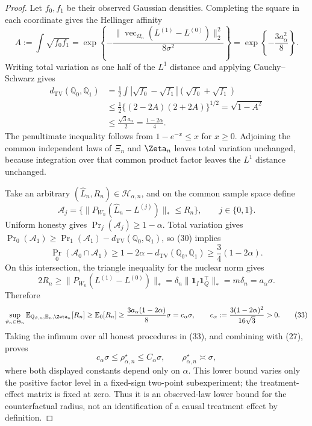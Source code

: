 \documentclass{article}
\begin{document}
\begin{proof}
Let \(f_0,f_1\) be their observed Gaussian densities.  Completing the square in each coordinate gives the Hellinger affinity
\[
A:=\int\sqrt{f_0f_1}
=\exp\!\left\{-\frac{\lVert
\operatorname{vec}_{\Omega_n}(L^{(1)}-L^{(0)})\rVert_2^2}
{8\sigma^2}\right\}
=\exp\!\left\{-\frac{3a_\alpha^2}{8}\right\}.       \tag{29}
\]
Writing total variation as one half of the \(L^1\) distance and applying Cauchy--Schwarz gives
\[
\begin{aligned}
d_{\mathrm{TV}}(\mathbb Q_0,\mathbb Q_1)
&=\frac12\int|\sqrt{f_0}-\sqrt{f_1}|(\sqrt{f_0}+\sqrt{f_1})\\
&\le\frac12\{(2-2A)(2+2A)\}^{1/2}
=\sqrt{1-A^2}\\
&\le\frac{\sqrt3a_\alpha}{2}
=\frac{1-2\alpha}{4}.                                  \tag{30}
\end{aligned}
\]
The penultimate inequality follows from \(1-e^{-x}\le x\) for \(x\ge0\).  Adjoining the common independent laws of \(\Xi_n\) and \(\Zeta_n\) leaves total variation unchanged, because integration over that common product factor leaves the \(L^1\) distance unchanged.

Take an arbitrary \((\widehat L_n,R_n)\in\mathcal H_{\alpha,n}\), and on the common sample space define
\[
\mathcal A_j=
\{\lVert P_{W_n}(\widehat L_n-L^{(j)})\rVert_*\le R_n\},
\qquad j\in\{0,1\}.
\]
Uniform honesty gives \(\Pr_j(\mathcal A_j)\ge1-\alpha\).  Total variation gives \(\Pr_0(\mathcal A_1)\ge\Pr_1(\mathcal A_1)-d_{\mathrm{TV}}(\mathbb Q_0,\mathbb Q_1)\), so (30) implies
\[
\Pr_0(\mathcal A_0\cap\mathcal A_1)
\ge1-2\alpha-d_{\mathrm{TV}}(\mathbb Q_0,\mathbb Q_1)
\ge\frac34(1-2\alpha).                                 \tag{31}
\]
On this intersection, the triangle inequality for the nuclear norm gives
\[
2R_n\ge\lVert P_{W_n}(L^{(1)}-L^{(0)})\rVert_*
=\delta_n\lVert\mathbf1_I\mathbf1_Q^{\top}\rVert_*
=m\delta_n=a_\alpha\sigma.                             \tag{32}
\]
Therefore
\[
\sup_{\vartheta_n\in\Theta_n}
\mathbb E_{\mathbb Q_{\vartheta,n},\Xi_n,\Zeta_n}[R_n]
\ge\mathbb E_0[R_n]
\ge\frac{3a_\alpha(1-2\alpha)}8\sigma
=c_\alpha\sigma,
\qquad
c_\alpha:=\frac{3(1-2\alpha)^2}{16\sqrt3}>0.          \tag{33}
\]
Taking the infimum over all honest procedures in (33), and combining with (27), proves
\[
c_\alpha\sigma\le\rho_{\alpha,n}^{\star}\le C_\alpha\sigma,
\qquad \rho_{\alpha,n}^{\star}\asymp\sigma,          \tag{34}
\]
where both displayed constants depend only on \(\alpha\).  This lower bound varies only the positive factor level in a fixed-sign two-point subexperiment; the treatment-effect matrix is fixed at zero.  Thus it is an observed-law lower bound for the counterfactual radius, not an identification of a causal treatment effect by definition.


\end{proof}
\end{document}
